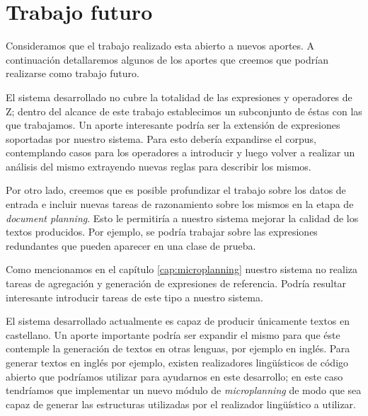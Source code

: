 \section*{Trabajo futuro}

Consideramos que el trabajo realizado esta abierto a nuevos aportes. A continuación detallaremos algunos de los aportes que creemos que podrían realizarse como trabajo futuro.

El sistema desarrollado no cubre la totalidad de las expresiones y operadores de Z; dentro del alcance de este trabajo establecimos un subconjunto de éstas con las que trabajamos. Un aporte interesante podría ser la extensión de expresiones soportadas por nuestro sistema. Para esto debería expandirse el corpus, contemplando casos para los operadores a introducir y luego volver a realizar un análisis del mismo extrayendo nuevas reglas para describir los mismos. 

Por otro lado, creemos que es posible profundizar el trabajo sobre los datos de entrada e incluir nuevas tareas de razonamiento sobre los mismos en la etapa de \textit{document planning}. Esto le permitiría a nuestro sistema mejorar la calidad de los textos producidos. Por ejemplo, se podría trabajar sobre las expresiones redundantes que pueden aparecer en una clase de prueba.

Como mencionamos en el capítulo \ref{cap:microplanning} nuestro sistema no realiza tareas de agregación y generación de expresiones de referencia. Podría resultar interesante introducir tareas de este tipo a nuestro sistema.

El sistema desarrollado actualmente es capaz de producir únicamente textos en castellano. Un aporte importante podría ser expandir el mismo para que éste contemple la generación de textos en otras lenguas, por ejemplo en inglés. Para generar textos en inglés por ejemplo, existen realizadores lingüísticos de código abierto que podríamos utilizar para ayudarnos en este desarrollo; en este caso tendríamos que implementar un nuevo módulo de \textit{microplanning} de modo que sea capaz de generar las estructuras utilizadas por el realizador lingüístico a utilizar.